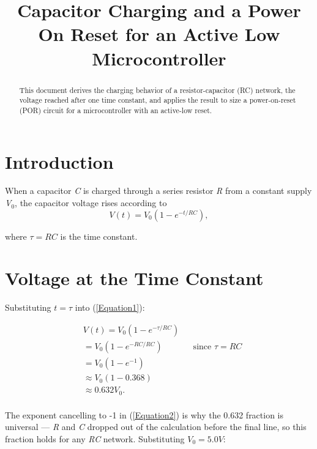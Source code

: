 \documentclass[conference]{IEEEtran}
\title{Capacitor Charging and a Power On Reset for an Active Low Microcontroller}
\author{
    \IEEEauthorblockN{Gianluca D'Altorio}
    \IEEEauthorblockA{Department of Computer Engineering Technology\\
    Vanier College}
}
\begin{document}
\maketitle

\begin{abstract}
    This document derives the charging behavior of a resistor-capacitor (RC) network, the voltage reached after one time constant, and applies the result to size a power-on-reset (POR) circuit for a microcontroller with an active-low reset.
\end{abstract}

\section{Introduction}
When a capacitor \textit{C} is charged through a series resistor \textit{R} from a constant supply \textit{V$_0$}, the capacitor voltage rises according to\\
\begin{equation}
    V(t)=V_0\left(1-e^{-t/RC}\right),
    \label{Equation1}
\end{equation}

\noindent where $\tau=\textit{RC}$ is the time constant.

\section{Voltage at the Time Constant}
\noindent Substituting $t=\tau$ into (\ref{Equation1}):

\begin{equation}
    \begin{aligned}
        &V(t)=V_0\left(1-e^{-\tau/RC}\right)\\
        &=V_0\left(1-e^{-RC/RC}\right)
        && \text{since } \tau=RC\\
        &=V_0\left(1-e^{-1}\right)\\
        &\approx V_0\left(1-0.368\right)\\
        &\approx 0.632V_0.\\
    \end{aligned}
    \label{Equation2}
\end{equation}

The exponent cancelling to -1 in (\ref{Equation2}) is why the 0.632 fraction is universal --- \textit{R} and \textit{C} dropped out of the calculation before the final line, so this fraction holds for any \textit{RC} network.  Substituting  $V_0=5.0V$:
\end{document}
